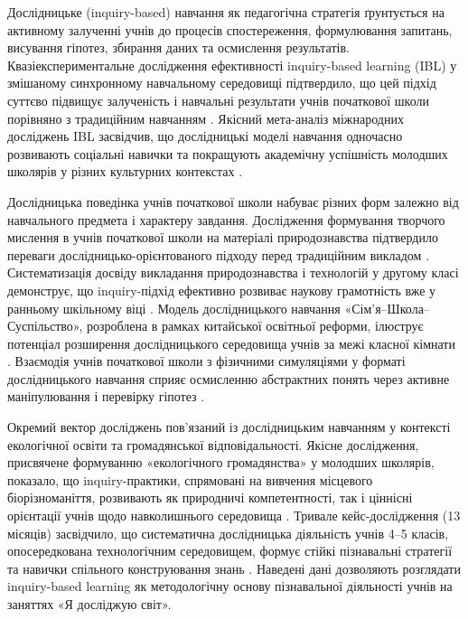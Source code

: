 \documentclass[a4paper,12pt]{article}
\begin{document}
Дослідницьке (inquiry-based) навчання як педагогічна стратегія ґрунтується на активному залученні учнів до процесів спостереження, формулювання запитань, висування гіпотез, збирання даних та осмислення результатів. Квазіекспериментальне дослідження ефективності inquiry-based learning (IBL) у змішаному синхронному навчальному середовищі підтвердило, що цей підхід суттєво підвищує залученість і навчальні результати учнів початкової школи порівняно з традиційним навчанням \parencite{Xu2026}. Якісний мета-аналіз міжнародних досліджень IBL засвідчив, що дослідницькі моделі навчання одночасно розвивають соціальні навички та покращують академічну успішність молодших школярів у різних культурних контекстах \parencite{Seprie2025}.

Дослідницька поведінка учнів початкової школи набуває різних форм залежно від навчального предмета і характеру завдання. Дослідження формування творчого мислення в учнів початкової школи на матеріалі природознавства підтвердило переваги дослідницько-орієнтованого підходу перед традиційним викладом \parencite{Leasa2025318}. Систематизація досвіду викладання природознавства і технологій у другому класі демонструє, що inquiry-підхід ефективно розвиває наукову грамотність вже у ранньому шкільному віці \parencite{Zuñiga-Quispe2025365}. Модель дослідницького навчання «Сім'я–Школа–Суспільство», розроблена в рамках китайської освітньої реформи, ілюструє потенціал розширення дослідницького середовища учнів за межі класної кімнати \parencite{Xia2025340}. Взаємодія учнів початкової школи з фізичними симуляціями у форматі дослідницького навчання сприяє осмисленню абстрактних понять через активне маніпулювання і перевірку гіпотез \parencite{Magkouta2024253}.

Окремий вектор досліджень пов'язаний із дослідницьким навчанням у контексті екологічної освіти та громадянської відповідальності. Якісне дослідження, присвячене формуванню «екологічного громадянства» у молодших школярів, показало, що inquiry-практики, спрямовані на вивчення місцевого біорізноманіття, розвивають як природничі компетентності, так і ціннісні орієнтації учнів щодо навколишнього середовища \parencite{Christodoulou2025969}. Тривале кейс-дослідження (13 місяців) засвідчило, що систематична дослідницька діяльність учнів 4--5 класів, опосередкована технологічним середовищем, формує стійкі пізнавальні стратегії та навички спільного конструювання знань \parencite{Viilo2018407}. Наведені дані дозволяють розглядати inquiry-based learning як методологічну основу пізнавальної діяльності учнів на заняттях «Я досліджую світ».
\end{document}
